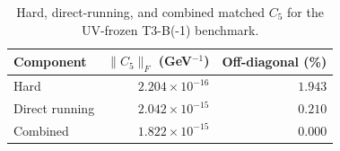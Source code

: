 \begin{table}[htbp]
\centering
\caption{Hard, direct-running, and combined matched $C_5$ for the UV-frozen T3-B(-1) benchmark.}
\label{tab:t3-c5-decomposition}
\begin{tabular}{lrr}
\toprule
Component & $\|C_5\|_F$ (GeV$^{-1}$) & Off-diagonal (\%) \\
\midrule
Hard & $2.204\times10^{-16}$ & $1.943$ \\
Direct running & $2.042\times10^{-15}$ & $0.210$ \\
Combined & $1.822\times10^{-15}$ & $0.000$ \\
\bottomrule
\end{tabular}
\end{table}
